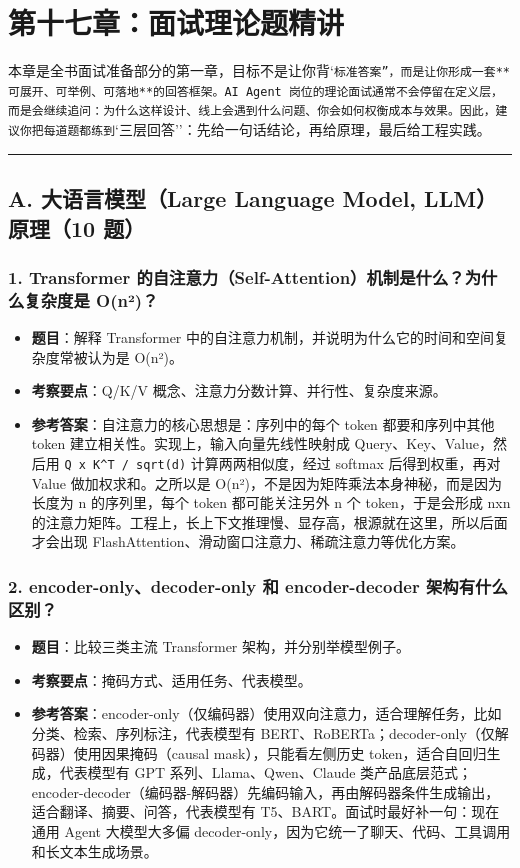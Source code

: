 \chapter{第十七章：面试理论题精讲}

本章是全书面试准备部分的第一章，目标不是让你背`\texttt{标准答案''，而是让你形成一套**可展开、可举例、可落地**的回答框架。AI Agent 岗位的理论面试通常不会停留在定义层，而是会继续追问：为什么这样设计、线上会遇到什么问题、你会如何权衡成本与效果。因此，建议你把每道题都练到}`三层回答''：先给一句话结论，再给原理，最后给工程实践。


\bigskip\hrule\bigskip

\section{A. 大语言模型（Large Language Model, LLM）原理（10 题）}

\subsection{1. Transformer 的自注意力（Self-Attention）机制是什么？为什么复杂度是 O(n²)？}
\begin{itemize}[leftmargin=2em]
\item \textbf{题目}：解释 Transformer 中的自注意力机制，并说明为什么它的时间和空间复杂度常被认为是 O(n²)。
\item \textbf{考察要点}：Q/K/V 概念、注意力分数计算、并行性、复杂度来源。
\item \textbf{参考答案}：自注意力的核心思想是：序列中的每个 token 都要和序列中其他 token 建立相关性。实现上，输入向量先线性映射成 Query、Key、Value，然后用 \texttt{Q x K\textasciicircum{}T / sqrt(d)} 计算两两相似度，经过 softmax 后得到权重，再对 Value 做加权求和。之所以是 O(n²)，不是因为矩阵乘法本身神秘，而是因为长度为 n 的序列里，每个 token 都可能关注另外 n 个 token，于是会形成 nxn 的注意力矩阵。工程上，长上下文推理慢、显存高，根源就在这里，所以后面才会出现 FlashAttention、滑动窗口注意力、稀疏注意力等优化方案。
\end{itemize}

\subsection{2. encoder-only、decoder-only 和 encoder-decoder 架构有什么区别？}
\begin{itemize}[leftmargin=2em]
\item \textbf{题目}：比较三类主流 Transformer 架构，并分别举模型例子。
\item \textbf{考察要点}：掩码方式、适用任务、代表模型。
\item \textbf{参考答案}：encoder-only（仅编码器）使用双向注意力，适合理解任务，比如分类、检索、序列标注，代表模型有 BERT、RoBERTa；decoder-only（仅解码器）使用因果掩码（causal mask），只能看左侧历史 token，适合自回归生成，代表模型有 GPT 系列、Llama、Qwen、Claude 类产品底层范式；encoder-decoder（编码器-解码器）先编码输入，再由解码器条件生成输出，适合翻译、摘要、问答，代表模型有 T5、BART。面试时最好补一句：现在通用 Agent 大模型大多偏 decoder-only，因为它统一了聊天、代码、工具调用和长文本生成场景。
\end{itemize}

